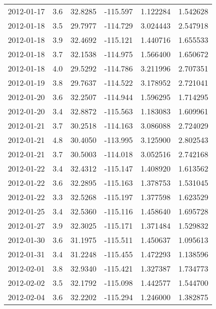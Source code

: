 \begin{tabular}{lrrrrr}
2012-01-17 &       3.6 &  32.8285 &  -115.597 &         1.122284 &         1.542628 \\
2012-01-18 &       3.5 &  29.7977 &  -114.729 &         3.024443 &         2.547918 \\
2012-01-18 &       3.9 &  32.4692 &  -115.121 &         1.440716 &         1.655533 \\
2012-01-18 &       3.7 &  32.1538 &  -114.975 &         1.566400 &         1.650672 \\
2012-01-18 &       4.0 &  29.5292 &  -114.786 &         3.211996 &         2.707351 \\
2012-01-19 &       3.8 &  29.7637 &  -114.522 &         3.178952 &         2.721041 \\
2012-01-20 &       3.6 &  32.2507 &  -114.944 &         1.596295 &         1.714295 \\
2012-01-20 &       3.4 &  32.8872 &  -115.563 &         1.183083 &         1.609961 \\
2012-01-21 &       3.7 &  30.2518 &  -114.163 &         3.086088 &         2.724029 \\
2012-01-21 &       4.8 &  30.4050 &  -113.995 &         3.125900 &         2.802543 \\
2012-01-21 &       3.7 &  30.5003 &  -114.018 &         3.052516 &         2.742168 \\
2012-01-22 &       3.4 &  32.4312 &  -115.147 &         1.408920 &         1.613562 \\
2012-01-22 &       3.6 &  32.2895 &  -115.163 &         1.378753 &         1.531045 \\
2012-01-22 &       3.3 &  32.5268 &  -115.197 &         1.377598 &         1.623529 \\
2012-01-25 &       3.4 &  32.5360 &  -115.116 &         1.458640 &         1.695728 \\
2012-01-27 &       3.9 &  32.3025 &  -115.171 &         1.371484 &         1.529832 \\
2012-01-30 &       3.6 &  31.1975 &  -115.511 &         1.450637 &         1.095613 \\
2012-01-31 &       3.4 &  31.2248 &  -115.455 &         1.472293 &         1.138596 \\
2012-02-01 &       3.8 &  32.9340 &  -115.421 &         1.327387 &         1.734773 \\
2012-02-02 &       3.5 &  32.1792 &  -115.098 &         1.442577 &         1.544700 \\
2012-02-04 &       3.6 &  32.2202 &  -115.294 &         1.246000 &         1.382875 \\

\end{tabular}
